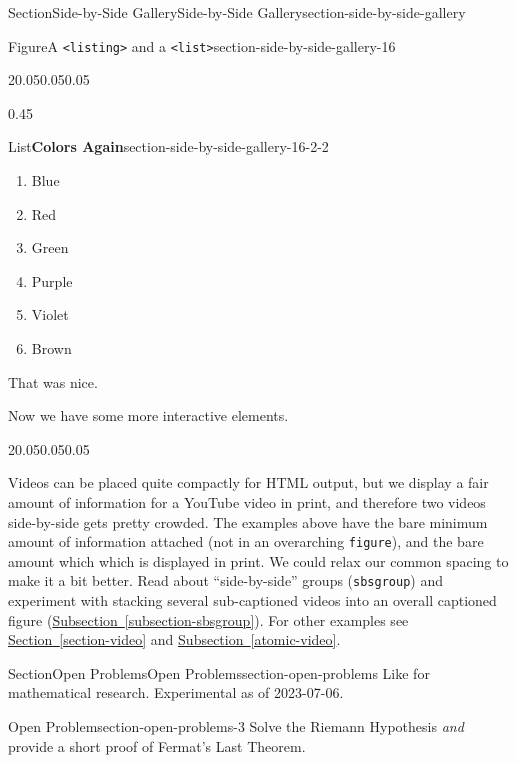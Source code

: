 \documentclass[twoside,10pt,]{article}
\newcommand{\xreffont}{\relax}
\newcommand{\mono}[1]{\texttt{#1}}
\numberwithin{equation}{section}
\begin{document}
\begin{sectionptx}{Section}{Side-by-Side Gallery}{}{Side-by-Side Gallery}{}{}{section-side-by-side-gallery}
\begin{figureptx}{Figure}{A \mono{<listing>} and a \mono{<list>}}{section-side-by-side-gallery-16}{}
\begin{sidebyside}{2}{0.05}{0.05}{0.05}
\begin{sbspanel}{0.45}
\begin{sublistptx}{List}{\textbf{Colors Again}}{section-side-by-side-gallery-16-2-2}{}
\begin{enumerate}
\item{}Blue%
\item{}Red%
\item{}Green%
\item{}Purple%
\item{}Violet%
\item{}Brown%
\end{enumerate}
That was nice.%
\tcblower
\end{sublistptx}%
\end{sbspanel}%
\end{sidebyside}%
\tcblower
\end{figureptx}%
Now we have some more interactive elements.%
\begin{sidebyside}{2}{0.05}{0.05}{0.05}%
\end{sidebyside}%
\par
Videos can be placed quite compactly for HTML output, but we display a fair amount of information for a YouTube video in print, and therefore two videos side-by-side gets pretty crowded.  The examples above have the bare minimum amount of information attached (not in an overarching \mono{figure}), and the bare amount which which is displayed in print.  We could relax our common spacing to make it a bit better.  Read about ``side-by-side'' groups (\mono{sbsgroup}) and experiment with stacking several sub-captioned videos into an overall captioned figure (\hyperref[subsection-sbsgroup]{Subsection~{\xreffont\ref{subsection-sbsgroup}}}).  For other examples see \hyperref[section-video]{Section~{\xreffont\ref{section-video}}} and \hyperref[atomic-video]{Subsection~{\xreffont\ref{atomic-video}}}.%
\end{sectionptx}
%
%
\typeout{************************************************}
\typeout{************************************************}
%
\begin{sectionptx}{Section}{Open Problems}{}{Open Problems}{}{}{section-open-problems}
Like for mathematical research.  Experimental as of 2023-07-06.%
\begin{openproblem}{Open Problem}{}{section-open-problems-3}%
Solve the Riemann Hypothesis\footnotemark{} \emph{and} provide a short proof of Fermat's Last Theorem.%
\end{openproblem}
%
\end{sectionptx}
%
%
\typeout{************************************************}
\end{document}
